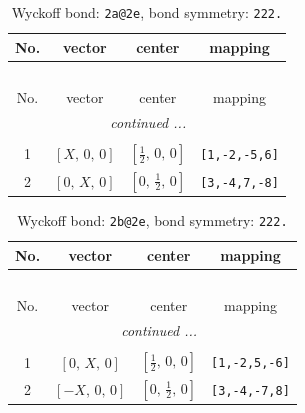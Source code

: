 \documentclass[fleqn,8pt]{jsarticle}
\begin{document}
\begin{longtable}{cccc}
\caption{Wyckoff bond: {\tt 2a@2e}, bond symmetry: {\tt 222.}}
 \\
 \hline \hline
No. & vector & center & mapping \\ \hline \endfirsthead

\multicolumn{3}{l}{\tablename\ \thetable{}} \\
 \hline \hline
No. & vector & center & mapping \\ \hline \endhead

 \hline \hline
\multicolumn{3}{r}{\footnotesize\it continued ...} \\ \endfoot

 \hline \hline
\multicolumn{3}{r}{} \\ \endlastfoot

1 & $\left[ X,\, 0,\, 0 \right]$ & $\left[ \frac{1}{2},\, 0,\, 0 \right]$ & {\tt [1,-2,-5,6]} \\ \hline
2 & $\left[ 0,\, X,\, 0 \right]$ & $\left[ 0,\, \frac{1}{2},\, 0 \right]$ & {\tt [3,-4,7,-8]} \\
\end{longtable}
\renewcommand{\arraystretch}{1.2}
\begin{longtable}{cccc}
\caption{Wyckoff bond: {\tt 2b@2e}, bond symmetry: {\tt 222.}}
 \\
 \hline \hline
No. & vector & center & mapping \\ \hline \endfirsthead

\multicolumn{3}{l}{\tablename\ \thetable{}} \\
 \hline \hline
No. & vector & center & mapping \\ \hline \endhead

 \hline \hline
\multicolumn{3}{r}{\footnotesize\it continued ...} \\ \endfoot

 \hline \hline
\multicolumn{3}{r}{} \\ \endlastfoot

1 & $\left[ 0,\, X,\, 0 \right]$ & $\left[ \frac{1}{2},\, 0,\, 0 \right]$ & {\tt [1,-2,5,-6]} \\ \hline
2 & $\left[ - X,\, 0,\, 0 \right]$ & $\left[ 0,\, \frac{1}{2},\, 0 \right]$ & {\tt [3,-4,-7,8]} \\
\end{longtable}
\renewcommand{\arraystretch}{1.2}
\end{document}
